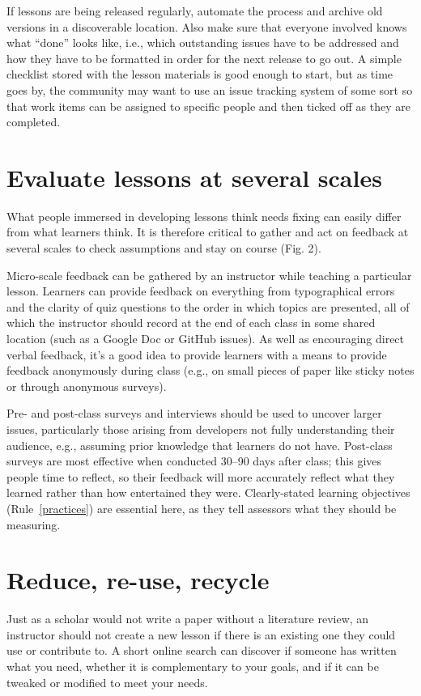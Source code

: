 \documentclass[10pt,letterpaper]{article}
\newcommand{\rulemajor}[2]{\section{#1}\label{#2}}
\newcommand{\ruleref}[1]{Rule~\ref{#1}}
\begin{document}
If lessons are being released regularly,
automate the process
and archive old versions in a discoverable location.
Also make sure that everyone involved knows what ``done'' looks like,
i.e.,
which outstanding issues have to be addressed
and how they have to be formatted
in order for the next release to go out.
A simple checklist stored with the lesson materials is good enough to start,
but as time goes by,
the community may want to use an issue tracking system of some sort
so that work items can be assigned to specific people
and then ticked off as they are completed.

\rulemajor{Evaluate lessons at several scales}{evaluate}

What people immersed in developing lessons think needs fixing
can easily differ from what learners think.
It is therefore critical to gather and act on feedback at several scales
to check assumptions and stay on course (Fig. 2).

Micro-scale feedback can be gathered by an instructor while teaching a particular lesson.
Learners can provide feedback on everything from typographical errors
and the clarity of quiz questions
to the order in which topics are presented,
all of which the instructor should record at the end of each class
in some shared location (such as a Google Doc or GitHub issues).
As well as encouraging direct verbal feedback,
it's a good idea to provide learners with a means to provide feedback anonymously during class
(e.g., on small pieces of paper like sticky notes or through anonymous surveys).

Pre- and post-class surveys and interviews should be used to uncover larger issues,
particularly those arising from developers not fully understanding their audience,
e.g.,
assuming prior knowledge that learners do not have.
Post-class surveys are most effective when conducted 30--90 days after class;
this gives people time to reflect,
so their feedback will more accurately reflect what they learned
rather than how entertained they were.
Clearly-stated learning objectives (\ruleref{practices}) are essential here,
as they tell assessors what they should be measuring.

\rulemajor{Reduce, re-use, recycle}{rrr}

Just as a scholar would not write a paper without a literature review,
an instructor should not create a new lesson if there is an existing one they could use or contribute to.
A short online search can discover if someone has written what you need,
whether it is complementary to your goals,
and if it can be tweaked or modified to meet your needs.
\end{document}
